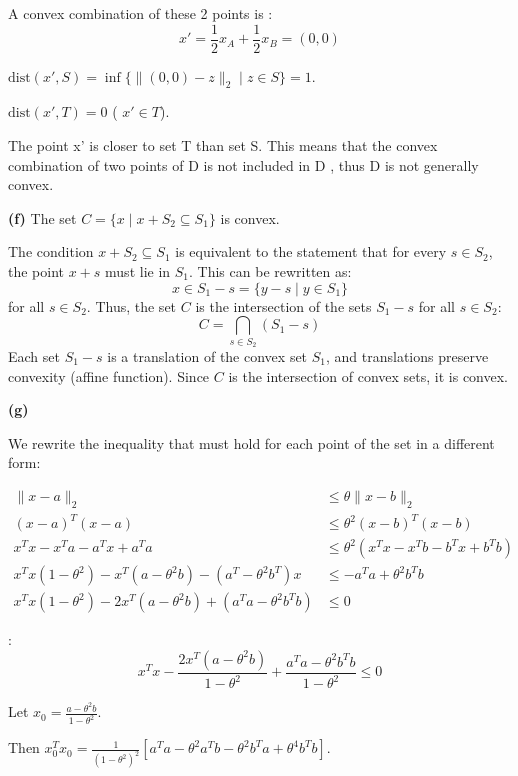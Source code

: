 \documentclass{article}
\begin{document}
A convex combination of these 2 points is : \[
x' = \frac{1}{2}x_A + \frac{1}{2}x_B = (0,0)
\]

$\text{dist}(x', S) = \inf\{\| (0,0) - z \|_2 \mid z \in S\} = 1$.

$\text{dist}(x', T) = 0$ ( $x' \in T$).

The point x' is closer to set T than set S. This means that the convex combination of two points of D is not included in D , thus D is not generally convex. 





\textbf{(f)}  The set $C = \{x \mid x+S_2 \subseteq S_1\}$ is convex.


The condition $x + S_2 \subseteq S_1$ is equivalent to the statement that for every $s \in S_2$, the point $x + s$ must lie in $S_1$. This can be rewritten as:
\[
x \in S_1 - s = \{ y - s \mid y \in S_1 \}
\]
for all $s \in S_2$. Thus, the set $C$ is the intersection of the sets $S_1 - s$ for all $s \in S_2$:
\[
C = \bigcap_{s \in S_2} (S_1 - s)
\]
Each set $S_1 - s$ is a translation of the convex set $S_1$, and translations preserve convexity (affine function). Since $C$ is the intersection of   convex sets, it is convex.



\textbf{(g)} 

We rewrite the inequality that must hold for each point of the set in a different form: 

\begin{align*}
\|x - a\|_2 &\leq \theta \|x - b\|_2 \\
(x - a)^T (x - a) &\leq \theta^2 (x - b)^T (x - b) \\
x^T x - x^T a - a^T x + a^T a &\leq \theta^2 (x^T x - x^T b - b^T x + b^T b) \\
x^T x (1 - \theta^2) - x^T (a - \theta^2 b) - (a^T - \theta^2 b^T) x &\leq -a^T a + \theta^2 b^T b \\
x^T x (1 - \theta^2) - 2x^T (a - \theta^2 b) + (a^T a - \theta^2 b^T b) &\leq 0
\end{align*}


 \theta {}:
\begin{equation*}
    x^T x - \frac{2 x^T (a - \theta^2 b)}{1 - \theta^2} + \frac{a^T a - \theta^2 b^T b}{1 - \theta^2} \leq 0
\end{equation*}

Let $x_0 = \frac{a - \theta^2 b}{1 - \theta^2}$.

Then $x_0^T x_0 = \frac{1}{(1 - \theta^2)^2} \left[ a^T a - \theta^2 a^T b - \theta^2 b^T a + \theta^4 b^T b \right]$.
\end{document}
